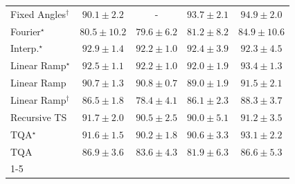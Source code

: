 \begin{tabular}{l|cccc|}
Fixed Angles$^\dagger$ & {\cellcolor[HTML]{04639B}} \color[HTML]{F1F1F1} $90.1\pm 2.2$ & {\cellcolor[HTML]{000000}} \color[HTML]{F1F1F1} {\cellcolor{white}} \color{black} - & {\cellcolor[HTML]{03466E}} \color[HTML]{F1F1F1} $93.7\pm 2.1$ & {\cellcolor[HTML]{023B5D}} \color[HTML]{F1F1F1} $94.9\pm 2.0$ \\
Fourier$^\star$ & {\cellcolor[HTML]{75A9CF}} \color[HTML]{F1F1F1} $80.5\pm 10.2$ & {\cellcolor[HTML]{81AED2}} \color[HTML]{F1F1F1} $79.6\pm 6.2$ & {\cellcolor[HTML]{69A5CC}} \color[HTML]{F1F1F1} $81.2\pm 8.2$ & {\cellcolor[HTML]{2D8ABD}} \color[HTML]{F1F1F1} $84.9\pm 10.6$ \\
Interp.$^\star$ & {\cellcolor[HTML]{034D79}} \color[HTML]{F1F1F1} $92.9\pm 1.4$ & {\cellcolor[HTML]{045483}} \color[HTML]{F1F1F1} $92.2\pm 1.0$ & {\cellcolor[HTML]{045382}} \color[HTML]{F1F1F1} $92.4\pm 3.9$ & {\cellcolor[HTML]{045483}} \color[HTML]{F1F1F1} $92.3\pm 4.5$ \\
Linear Ramp$^\star$ & {\cellcolor[HTML]{045280}} \color[HTML]{F1F1F1} $92.5\pm 1.1$ & {\cellcolor[HTML]{045483}} \color[HTML]{F1F1F1} $92.2\pm 1.0$ & {\cellcolor[HTML]{045687}} \color[HTML]{F1F1F1} $92.0\pm 1.9$ & {\cellcolor[HTML]{034973}} \color[HTML]{F1F1F1} $93.4\pm 1.3$ \\
Linear Ramp & {\cellcolor[HTML]{045F95}} \color[HTML]{F1F1F1} $90.7\pm 1.3$ & {\cellcolor[HTML]{045F95}} \color[HTML]{F1F1F1} $90.8\pm 0.7$ & {\cellcolor[HTML]{0569A5}} \color[HTML]{F1F1F1} $89.0\pm 1.9$ & {\cellcolor[HTML]{045A8D}} \color[HTML]{F1F1F1} $91.5\pm 2.1$ \\
Linear Ramp$^\dagger$ & {\cellcolor[HTML]{187CB6}} \color[HTML]{F1F1F1} $86.5\pm 1.8$ & {\cellcolor[HTML]{91B5D6}} \color[HTML]{000000} $78.4\pm 4.1$ & {\cellcolor[HTML]{1C7FB8}} \color[HTML]{F1F1F1} $86.1\pm 2.3$ & {\cellcolor[HTML]{056DAC}} \color[HTML]{F1F1F1} $88.3\pm 3.7$ \\
Recursive TS & {\cellcolor[HTML]{04598C}} \color[HTML]{F1F1F1} $91.7\pm 2.0$ & {\cellcolor[HTML]{046097}} \color[HTML]{F1F1F1} $90.5\pm 2.5$ & {\cellcolor[HTML]{04639B}} \color[HTML]{F1F1F1} $90.0\pm 5.1$ & {\cellcolor[HTML]{045C90}} \color[HTML]{F1F1F1} $91.2\pm 3.5$ \\
TQA$^\star$ & {\cellcolor[HTML]{045A8D}} \color[HTML]{F1F1F1} $91.6\pm 1.5$ & {\cellcolor[HTML]{04629A}} \color[HTML]{F1F1F1} $90.2\pm 1.8$ & {\cellcolor[HTML]{046096}} \color[HTML]{F1F1F1} $90.6\pm 3.3$ & {\cellcolor[HTML]{034C78}} \color[HTML]{F1F1F1} $93.1\pm 2.2$ \\
TQA & {\cellcolor[HTML]{1278B4}} \color[HTML]{F1F1F1} $86.9\pm 3.6$ & {\cellcolor[HTML]{4094C3}} \color[HTML]{F1F1F1} $83.6\pm 4.3$ & {\cellcolor[HTML]{5EA0CA}} \color[HTML]{F1F1F1} $81.9\pm 6.3$ & {\cellcolor[HTML]{167BB6}} \color[HTML]{F1F1F1} $86.6\pm 5.3$ \\
\cline{1-5}
\bottomrule
\end{tabular}
